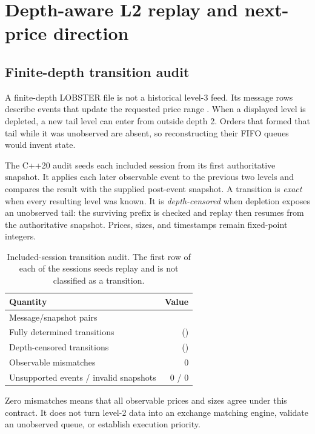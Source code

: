 \documentclass[11pt,a4paper]{article}
\begin{document}
\section{Depth-aware L2 replay and next-price direction}
\label{sec:replay}

\subsection{Finite-depth transition audit}

A finite-depth LOBSTER file is not a historical level-3 feed. Its message rows
describe events that update the requested price range
\citep{lobsterstructure}. When a displayed level is depleted, a new tail level
can enter from outside depth 2. Orders that formed that tail while it was
unobserved are absent, so reconstructing their FIFO queues would invent state.

The C++20 audit seeds each included session from its first authoritative
snapshot. It applies each later observable event to the previous two levels and
compares the result with the supplied post-event snapshot. A transition is
\emph{exact} when every resulting level was known. It is
\emph{depth-censored} when depletion exposes an unobserved tail: the surviving
prefix is checked and replay then resumes from the authoritative snapshot.
Prices, sizes, and timestamps remain fixed-point integers.

\begin{table}[H]
  \centering
  \caption{Included-session transition audit. The first row of each of the
  \Sessions{} sessions seeds replay and is not classified as a transition.}
  \label{tab:replayaudit}
  \begin{tabular}{lr}
    \toprule
    Quantity & Value \\
    \midrule
    Message/snapshot pairs & \ReplayEvents{} \\
    Fully determined transitions & \ReplayExact{} (\ReplayExactFraction{}) \\
    Depth-censored transitions & \ReplayCensored{} (\ReplayCensoredFraction{}) \\
    Observable mismatches & 0 \\
    Unsupported events / invalid snapshots & 0 / 0 \\
    \bottomrule
  \end{tabular}
\end{table}

Zero mismatches means that all observable prices and sizes agree under this
contract. It does not turn level-2 data into an exchange matching engine,
validate an unobserved queue, or establish execution priority.
\end{document}
